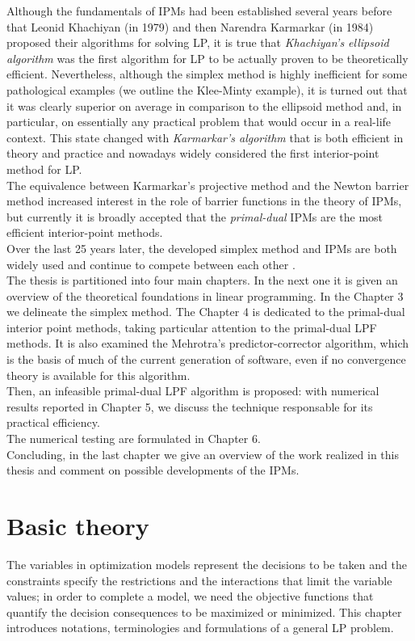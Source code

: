 \documentclass[a4paper,10 pt,titlepage,twoside]{report}
\theoremstyle{plain}
\theoremstyle{definition}
\theoremstyle{remark}
\begin{document}
Although the fundamentals of IPMs had been established several years before that Leonid Khachiyan (in 1979) and then Narendra Karmarkar (in 1984) proposed their algorithms for solving LP, it is true that \textit{Khachiyan’s ellipsoid algorithm} was the first algorithm for LP to be actually proven to be theoretically efficient. Nevertheless, although the simplex method is highly inefficient for some pathological examples (we outline the Klee-Minty example), it is turned out that it was clearly superior on average in comparison to the ellipsoid method and, in particular, on essentially any practical problem that would occur in a real-life context. This state changed with \textit{Karmarkar’s algorithm} that is both efficient in theory and practice and nowadays widely considered the first interior-point method for LP.\\
The equivalence between Karmarkar's projective method and the Newton barrier method increased interest in the role of barrier functions in the theory of IPMs, but currently it is broadly accepted that the \textit{primal-dual} IPMs are the most efficient interior-point methods.\\
Over the last 25 years later, the developed simplex method and IPMs are both widely used and continue to compete between each other \cite{25y}. \\
The thesis is partitioned into four main chapters.
In the next one it is given an overview of the theoretical foundations in linear programming. In the Chapter 3 we delineate the simplex method. The Chapter 4 is dedicated to the primal-dual interior point methods, taking particular attention to the primal-dual LPF methods. It is also examined the Mehrotra's predictor-corrector algorithm, which is the basis of much of the current generation of software, even if no convergence theory is available for this algorithm.\\
Then, an infeasible primal-dual LPF algorithm is proposed: with numerical results reported in Chapter 5, we discuss the technique responsable for its practical efficiency.\\
The numerical testing are formulated in Chapter 6.\\
Concluding, in the last chapter we give an overview of the work realized in this thesis and comment on possible developments of the IPMs. 

%
%

\chapter{Basic theory}
The variables in optimization models represent the decisions to be taken and the constraints specify the restrictions and the interactions that limit the variable values; in order to complete a model, we need the objective functions that quantify the decision consequences to be maximized or minimized. This chapter introduces notations, terminologies and formulations of a general LP problem.
\end{document}
